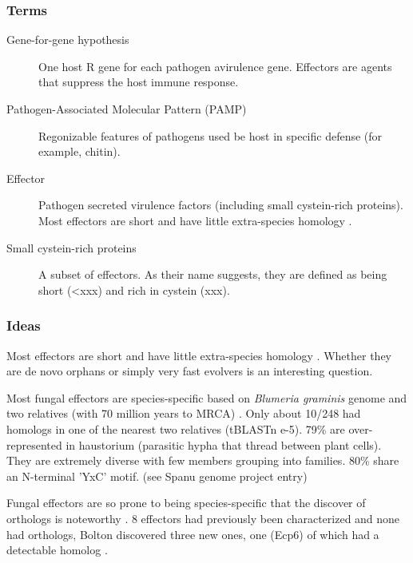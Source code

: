     \subsubsection{Terms}

    \begin{description}
        \item[Gene-for-gene hypothesis] One host R gene for each pathogen
            avirulence gene. Effectors are agents that suppress the host immune
            response.
        \item[Pathogen-Associated Molecular Pattern (PAMP)] Regonizable
            features of pathogens used be host in specific defense (for
            example, chitin).
        \item[Effector] Pathogen secreted virulence factors (including small
            cystein-rich proteins). Most effectors are short and have little
            extra-species homology \cite{stergiopoulos_fungal_2009,
            bowen_venturia_2011}.
        \item[Small cystein-rich proteins] A subset of effectors. As their name
            suggests, they are defined as being short (<xxx) and rich in
            cystein (xxx).     
    \end{description}

    \subsubsection{Ideas}

    Most effectors are short and have little extra-species homology
    \cite{stergiopoulos_fungal_2009, bowen_venturia_2011}. Whether they are
    de novo orphans or simply very fast evolvers is an interesting
    question. 

    Most fungal effectors are species-specific based on \textit{Blumeria
    graminis} genome and two relatives (with 70 million years to MRCA)
    \cite{spanu_genome_2010}. Only about 10/248 had homologs in one of the
    nearest two relatives (tBLASTn e-5). 79\% are over-represented in
    haustorium (parasitic hypha that thread between plant cells). They are
    extremely diverse with few members grouping into families. 80\% share an
    N-terminal 'YxC' motif. (see Spanu genome project entry)

    Fungal effectors are so prone to being species-specific that the discover
    of orthologs is noteworthy \cite{bolton_novel_2008,
    stergiopoulos_tomato_2010}. 8 effectors had previously been characterized
    and none had orthologs, Bolton discovered three new ones, one (Ecp6) of which had
    a detectable homolog \cite{bolton_novel_2008}.

